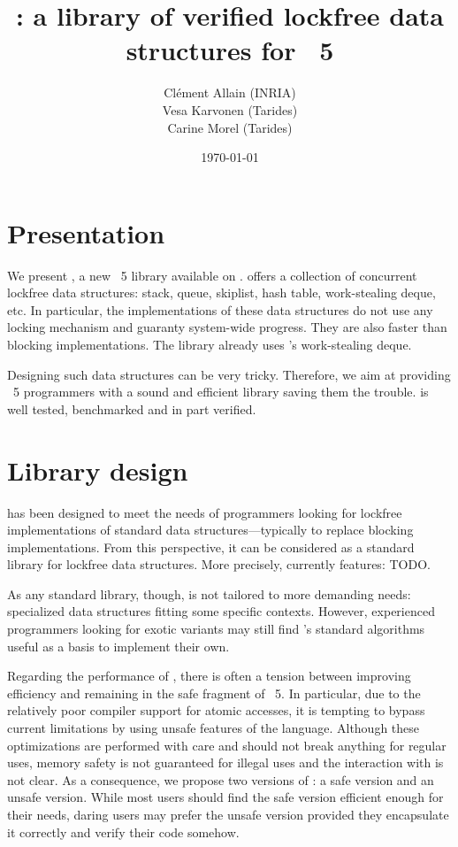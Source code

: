 \documentclass[a4paper, 11pt]{article}
\title{\Saturn: a library of verified lockfree data structures for \OCaml~5}
\date{\today}
\author{
  Clément Allain (INRIA) \\
  Vesa Karvonen (Tarides) \\
  Carine Morel (Tarides)
}
\begin{document}
\maketitle

\section{Presentation}

We present \Saturn, a new \OCaml~5 library available on \opam.
\Saturn offers a collection of concurrent lockfree data structures: stack, queue, skiplist, hash table, work-stealing deque, etc.
In particular, the implementations of these data structures do not use any locking mechanism and guaranty system-wide progress.
They are also faster than blocking implementations.
The \Domainslib library already uses \Saturn's work-stealing deque.

Designing such data structures can be very tricky.
Therefore, we aim at providing \OCaml~5 programmers with a sound and efficient library saving them the trouble.
\Saturn is well tested, benchmarked and in part verified.

\section{Library design}

\Saturn has been designed to meet the needs of programmers looking for lockfree implementations of standard data structures---typically to replace blocking implementations.
From this perspective, it can be considered as a standard library for lockfree data structures.
More precisely, \Saturn currently features: TODO.

As any standard library, though, \Saturn is not tailored to more demanding needs: specialized data structures fitting some specific contexts.
However, experienced programmers looking for exotic variants may still find \Saturn's standard algorithms useful as a basis to implement their own.

Regarding the performance of \Saturn, there is often a tension between improving efficiency and remaining in the safe fragment of \OCaml~5.
In particular, due to the relatively poor compiler support for atomic accesses, it is tempting to bypass current limitations by using unsafe features of the language.
Although these optimizations are performed with care and should not break anything for regular uses, memory safety is not guaranteed for illegal uses and the interaction with \Flambda is not clear.
As a consequence, we propose two versions of \Saturn: a safe version and an unsafe version.
While most users should find the safe version efficient enough for their needs, daring users may prefer the unsafe version provided they encapsulate it correctly and verify their code somehow.
\end{document}
